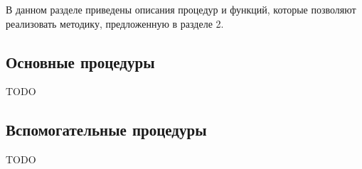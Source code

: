 \documentclass[../main.tex]{subfiles}
\begin{document}
В данном разделе приведены описания процедур и функций, которые позволяют реализовать методику, предложенную в разделе 2.

\subsection{Основные процедуры}
TODO

\subsection{Вспомогательные процедуры}
TODO
\end{document}
